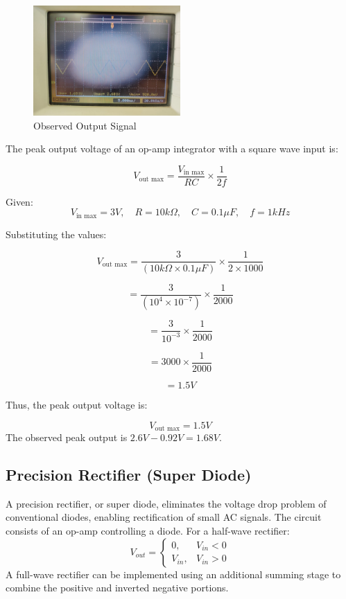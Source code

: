 \documentclass[a4paper,12pt]{article}
\begin{document}
\begin{figure}[H]
    \centering
    \includegraphics[width=0.5\textwidth]{figs/integrator1.png}
    \caption{Observed Output Signal}
\end{figure}
The peak output voltage of an op-amp integrator with a square wave input is:

\[
V_{\text{out max}} = \frac{V_{\text{in max}}}{RC} \times \frac{1}{2f}
\]

Given:
\[
V_{\text{in max}} = 3V, \quad R = 10k\Omega, \quad C = 0.1\mu F, \quad f = 1kHz
\]

Substituting the values:

\[
V_{\text{out max}} = \frac{3}{(10k\Omega \times 0.1\mu F)} \times \frac{1}{2 \times 1000}
\]

\[
= \frac{3}{(10^4 \times 10^{-7})} \times \frac{1}{2000}
\]

\[
= \frac{3}{10^{-3}} \times \frac{1}{2000}
\]

\[
= 3000 \times \frac{1}{2000}
\]

\[
= 1.5V
\]

Thus, the peak output voltage is:

\[
V_{\text{out max}} = 1.5V
\]
The observed peak output is $2.6V - 0.92V = 1.68V$.
\subsection{Precision Rectifier (Super Diode)}
A precision rectifier, or super diode, eliminates the voltage drop problem of conventional diodes, enabling rectification of small AC signals. The circuit consists of an op-amp controlling a diode. For a half-wave rectifier:
\begin{equation}
    V_{out} = \begin{cases} 
        0, & V_{in} < 0 \\ 
        V_{in}, & V_{in} > 0
    \end{cases}
\end{equation}
A full-wave rectifier can be implemented using an additional summing stage to combine the positive and inverted negative portions.
\end{document}

